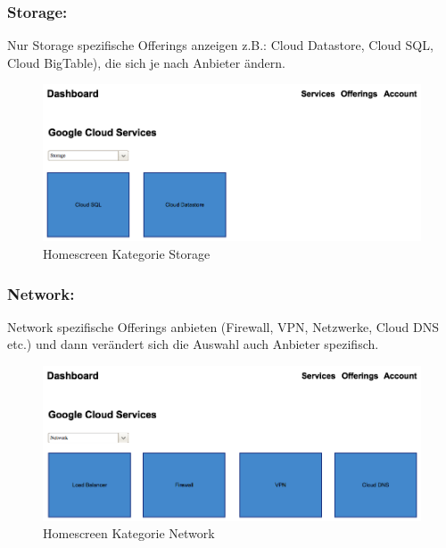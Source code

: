 \subsubsection{Storage:}

Nur Storage spezifische Offerings anzeigen z.B.: Cloud Datastore, Cloud SQL, 
Cloud BigTable), die sich je nach Anbieter ändern. 
\begin{figure}[!htbp]
 \includegraphics[width=\textwidth]{./03_Analyse/03_Dashboard/images/homescreen_google_storage}
  \caption{Homescreen Kategorie Storage}
\end{figure}

\subsubsection{Network:}
Network spezifische Offerings anbieten (Firewall, VPN, Netzwerke, Cloud DNS etc.) 
und dann verändert sich die Auswahl auch Anbieter spezifisch. 

\begin{figure}[!htbp]
 \includegraphics[width=\textwidth]{./03_Analyse/03_Dashboard/images/homescreen_google_network}
    \caption{Homescreen Kategorie Network}
\end{figure}

\newpage

